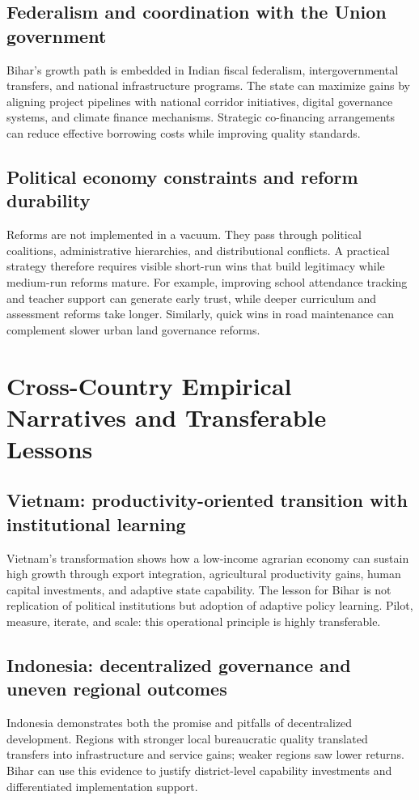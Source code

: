 \documentclass[preprint,12pt]{elsarticle}
\begin{document}
\subsection{Federalism and coordination with the Union government}
Bihar's growth path is embedded in Indian fiscal federalism, intergovernmental transfers, and national infrastructure programs. The state can maximize gains by aligning project pipelines with national corridor initiatives, digital governance systems, and climate finance mechanisms. Strategic co-financing arrangements can reduce effective borrowing costs while improving quality standards.

\subsection{Political economy constraints and reform durability}
Reforms are not implemented in a vacuum. They pass through political coalitions, administrative hierarchies, and distributional conflicts. A practical strategy therefore requires visible short-run wins that build legitimacy while medium-run reforms mature. For example, improving school attendance tracking and teacher support can generate early trust, while deeper curriculum and assessment reforms take longer. Similarly, quick wins in road maintenance can complement slower urban land governance reforms.

\section{Cross-Country Empirical Narratives and Transferable Lessons}
\subsection{Vietnam: productivity-oriented transition with institutional learning}
Vietnam's transformation shows how a low-income agrarian economy can sustain high growth through export integration, agricultural productivity gains, human capital investments, and adaptive state capability. The lesson for Bihar is not replication of political institutions but adoption of adaptive policy learning. Pilot, measure, iterate, and scale: this operational principle is highly transferable.

\subsection{Indonesia: decentralized governance and uneven regional outcomes}
Indonesia demonstrates both the promise and pitfalls of decentralized development. Regions with stronger local bureaucratic quality translated transfers into infrastructure and service gains; weaker regions saw lower returns. Bihar can use this evidence to justify district-level capability investments and differentiated implementation support.
\end{document}
